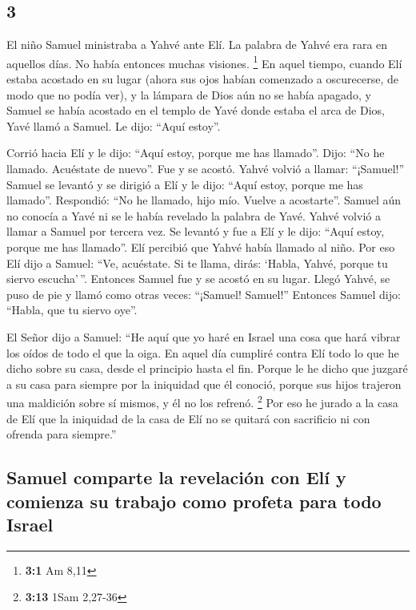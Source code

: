 \begin{paracol}{2}
\hypertarget{section-4}{%
\section{3}\label{section-4}}

 El niño Samuel ministraba a Yahvé ante Elí. La palabra de
Yahvé era rara en aquellos días. No había entonces muchas visiones.
\footnote{\textbf{3:1} Am 8,11}  En aquel tiempo, cuando
Elí estaba acostado en su lugar (ahora sus ojos habían comenzado a
oscurecerse, de modo que no podía ver),  y la lámpara de
Dios aún no se había apagado, y Samuel se había acostado en el templo de
Yavé donde estaba el arca de Dios,  Yavé llamó a Samuel.
Le dijo: ``Aquí estoy''.

 Corrió hacia Elí y le dijo: ``Aquí estoy, porque me has
llamado''. Dijo: ``No he llamado. Acuéstate de nuevo''. Fue y se acostó.
 Yahvé volvió a llamar: ``¡Samuel!'' Samuel se levantó y
se dirigió a Elí y le dijo: ``Aquí estoy, porque me has llamado''.
Respondió: ``No he llamado, hijo mío. Vuelve a acostarte''.
 Samuel aún no conocía a Yavé ni se le había revelado la
palabra de Yavé.  Yahvé volvió a llamar a Samuel por
tercera vez. Se levantó y fue a Elí y le dijo: ``Aquí estoy, porque me
has llamado''. Elí percibió que Yahvé había llamado al niño.
 Por eso Elí dijo a Samuel: ``Ve, acuéstate. Si te llama,
dirás: `Habla, Yahvé, porque tu siervo escucha'\,''. Entonces Samuel fue
y se acostó en su lugar.  Llegó Yahvé, se puso de pie y
llamó como otras veces: ``¡Samuel! Samuel!'' Entonces Samuel dijo:
``Habla, que tu siervo oye''.

 El Señor dijo a Samuel: ``He aquí que yo haré en Israel
una cosa que hará vibrar los oídos de todo el que la oiga.
 En aquel día cumpliré contra Elí todo lo que he dicho
sobre su casa, desde el principio hasta el fin.  Porque
le he dicho que juzgaré a su casa para siempre por la iniquidad que él
conoció, porque sus hijos trajeron una maldición sobre sí mismos, y él
no los refrenó. \footnote{\textbf{3:13} 1Sam 2,27-36} 
Por eso he jurado a la casa de Elí que la iniquidad de la casa de Elí no
se quitará con sacrificio ni con ofrenda para siempre.''

\hypertarget{samuel-comparte-la-revelaciuxf3n-con-eluxed-y-comienza-su-trabajo-como-profeta-para-todo-israel}{%
\subsection{Samuel comparte la revelación con Elí y comienza su trabajo
como profeta para todo
Israel}\label{samuel-comparte-la-revelaciuxf3n-con-eluxed-y-comienza-su-trabajo-como-profeta-para-todo-israel}}


\end{paracol}
